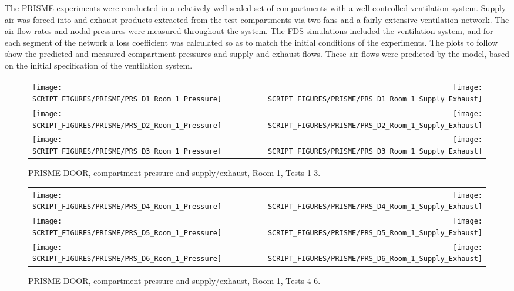 The PRISME experiments were conducted in a relatively well-sealed set of compartments with a well-controlled ventilation system. Supply air was forced into and exhaust products extracted from the test compartments via two fans and a fairly extensive ventilation network. The air flow rates and nodal pressures were measured throughout the system. The FDS simulations included the ventilation system, and for each segment of the network a loss coefficient was calculated so as to match the initial conditions of the experiments. The plots to follow show the predicted and measured compartment pressures and supply and exhaust flows. These air flows were predicted by the model, based on the initial specification of the ventilation system.

\newpage

\begin{figure}[p]
\begin{tabular*}{\textwidth}{l@{\extracolsep{\fill}}r}
\texttt{[image: SCRIPT\_FIGURES/PRISME/PRS\_D1\_Room\_1\_Pressure]} &
\texttt{[image: SCRIPT\_FIGURES/PRISME/PRS\_D1\_Room\_1\_Supply\_Exhaust]} \\
\texttt{[image: SCRIPT\_FIGURES/PRISME/PRS\_D2\_Room\_1\_Pressure]} &
\texttt{[image: SCRIPT\_FIGURES/PRISME/PRS\_D2\_Room\_1\_Supply\_Exhaust]} \\
\texttt{[image: SCRIPT\_FIGURES/PRISME/PRS\_D3\_Room\_1\_Pressure]} &
\texttt{[image: SCRIPT\_FIGURES/PRISME/PRS\_D3\_Room\_1\_Supply\_Exhaust]}
\end{tabular*}
\caption[PRISME DOOR, compartment pressure and supply/exhaust, Room 1, Tests 1-3]{PRISME DOOR, compartment pressure and supply/exhaust, Room 1, Tests 1-3.}
\label{PRISME_Room_1_Pressure_1-3}
\end{figure}

\begin{figure}[p]
\begin{tabular*}{\textwidth}{l@{\extracolsep{\fill}}r}
\texttt{[image: SCRIPT\_FIGURES/PRISME/PRS\_D4\_Room\_1\_Pressure]} &
\texttt{[image: SCRIPT\_FIGURES/PRISME/PRS\_D4\_Room\_1\_Supply\_Exhaust]} \\
\texttt{[image: SCRIPT\_FIGURES/PRISME/PRS\_D5\_Room\_1\_Pressure]} &
\texttt{[image: SCRIPT\_FIGURES/PRISME/PRS\_D5\_Room\_1\_Supply\_Exhaust]} \\
\texttt{[image: SCRIPT\_FIGURES/PRISME/PRS\_D6\_Room\_1\_Pressure]} &
\texttt{[image: SCRIPT\_FIGURES/PRISME/PRS\_D6\_Room\_1\_Supply\_Exhaust]}
\end{tabular*}
\caption[PRISME DOOR, compartment pressure and supply/exhaust, Room 1, Tests 4-6]{PRISME DOOR, compartment pressure and supply/exhaust, Room 1, Tests 4-6.}
\label{PRISME_Room_1_Pressure_4-6}
\end{figure}

